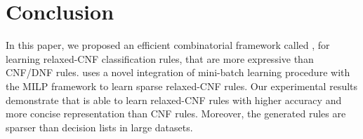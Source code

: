 \section{Conclusion}
\label{interpretability_crr_sec:conclusion}

In this paper, we proposed an efficient combinatorial framework called {\crr}, for learning relaxed-CNF  classification rules, that are  more expressive  than CNF/DNF rules.  {\crr}  uses a novel integration of mini-batch learning procedure with the MILP framework to learn sparse relaxed-CNF rules. Our experimental results demonstrate that {\crr} is able to learn relaxed-CNF  rules with higher accuracy and more concise representation than CNF rules. Moreover, the generated rules are sparser than decision lists in large datasets. 